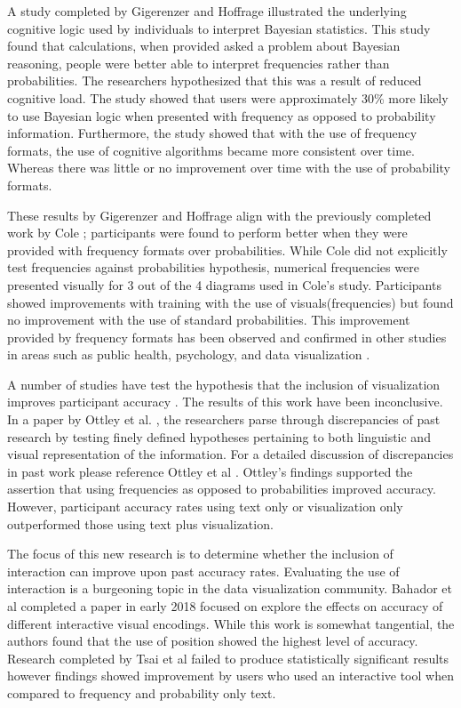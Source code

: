 A study completed by Gigerenzer and Hoffrage \cite{Gigerenzer1995} illustrated the
underlying cognitive logic used by individuals to interpret Bayesian
statistics. This study found that calculations, when provided asked a problem about Bayesian reasoning, people were better able to interpret frequencies rather than probabilities. The researchers
hypothesized that this was a result of reduced cognitive load. The study showed that users were
approximately 30\% more likely to use Bayesian logic when presented with
frequency as opposed to probability information. Furthermore, the study
showed that with the use of frequency formats, the use of cognitive
algorithms became more consistent over time. Whereas there was little or no
improvement over time with the use of probability formats.

These results by Gigerenzer and Hoffrage \cite{Gigerenzer1995} align with the
previously completed work by Cole \cite{Cole1989}; participants were found to
perform better when they were provided with frequency formats over
probabilities. While Cole did not explicitly test frequencies against
probabilities hypothesis, numerical frequencies were presented visually for 3
out of the 4 diagrams used in Cole’s study. Participants showed improvements
with training with the use of visuals(frequencies) but found no improvement
with the use of standard probabilities. This improvement provided by frequency formats has been observed and confirmed in other studies in areas such as public health, psychology, and data visualization \cite{Eddy1982, Galesic2009, Cohen2007, Brown2014, Brase2009}. 

A number of studies have test the hypothesis that the inclusion of
visualization improves participant accuracy \cite{Brown2014, Friederichs2014,
Cohen2007}. The results of this work have been inconclusive. In a paper by
Ottley et al. \cite{Ottley2016}, the researchers parse through discrepancies
of past research by testing finely defined hypotheses pertaining to both
linguistic and visual representation of the information. For a detailed
discussion of discrepancies in past work please reference Ottley et al \cite{Ottley2016}.
Ottley’s findings supported the assertion that using frequencies as opposed to
probabilities improved accuracy. However, participant accuracy rates using
text only or visualization only outperformed those using text plus
visualization.

The focus of this new research is to determine whether the inclusion of
interaction can improve upon past accuracy rates. Evaluating the use of
interaction is a burgeoning topic in the data visualization community.
Bahador et al completed a paper \cite{Saket2018} in early 2018 focused on explore the effects
on accuracy of different interactive visual encodings. While this work is
somewhat tangential, the authors found that the use of position showed the
highest level of accuracy. Research completed by Tsai et al \cite{Tsai2011} failed to
produce statistically significant results however findings showed improvement
by users who used an interactive tool when compared to frequency and
probability only text.




